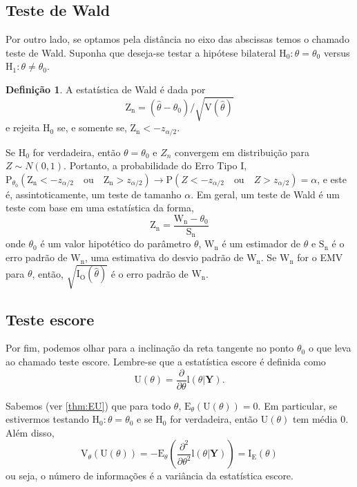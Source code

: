 \documentclass[
  9pt,
  a5paper,
]{book}
\theoremstyle{definition}
\newtheorem{definition}{Definição}[chapter]
\theoremstyle{definition}
\theoremstyle{definition}
\theoremstyle{definition}
\theoremstyle{remark}
\begin{document}
\hypertarget{teste-de-wald}{%
\subsection{Teste de Wald}\label{teste-de-wald}}

Por outro lado, se optamos pela distância no eixo das abscissas temos o chamado teste de Wald. Suponha que deseja-se testar a hipótese bilateral \(\mathrm{H_0} : \theta = \theta_0\) versus \(\mathrm{H_1} : \theta \neq \theta_0\).

\begin{definition}
\protect\hypertarget{def:unnamed-chunk-20}{}\label{def:unnamed-chunk-20}A estatística de Wald é dada por
\[\mathrm{Z_n} = (\hat{\theta} - \theta_0)/\sqrt{\mathrm{V}(\hat{\theta})}\]
e rejeita \(\mathrm{H_0}\) se, e somente se, \(\mathrm{Z_n} < -z_{\alpha/2}\).
\end{definition}

Se \(\mathrm{H_0}\) for verdadeira, então \(\theta = \theta_0\) e \(Z_n\) convergem em distribuição para \(Z \sim N(0,1)\). Portanto, a probabilidade do Erro Tipo I, \(\mathrm{P}_{\theta_0}(\mathrm{Z_n} < - z_{\alpha/2} \quad \text{ou} \quad \mathrm{Z_n} > z_{\alpha/2}) \to \mathrm{P}(Z < -z_{\alpha/2} \quad \text{ou} \quad Z > z_{\alpha/2}) = \alpha\), e este é, assintoticamente, um teste de tamanho \(\alpha\). Em geral, um teste de Wald é um teste com base em uma estatística da forma,
\[ \mathrm{Z_n} = \frac{\mathrm{W_n} -  \theta_0}{\mathrm{S_n} } \]
onde \(\theta_0\) é um valor hipotético do parâmetro \(\theta\), \(\mathrm{W_n}\) é um estimador de \(\theta\) e \(\mathrm{S_n}\) é o erro padrão de \(\mathrm{W_n}\), uma estimativa do desvio padrão de \(\mathrm{W_n}\). Se \(\mathrm{W_n}\) for o EMV para \(\theta\), então, \(\sqrt{\mathrm{I_O}(\hat{\theta})}\) é o erro padrão de \(\mathrm{W_n}\).

\hypertarget{teste-escore}{%
\subsection{Teste escore}\label{teste-escore}}

Por fim, podemos olhar para a inclinação da reta tangente no ponto \(\theta_0\) o que leva ao chamado teste escore. Lembre-se que a estatística escore é definida como
\[\mathrm{U}(\theta) = \frac{\partial}{\partial \theta} \mathrm{l}(\theta | \boldsymbol{Y}).\]

Sabemos (ver \ref{thm:EU}) que para todo \(\theta\), \(\mathrm{E}_{\theta} (\mathrm{U}(\theta)) = 0\).
Em particular, se estivermos testando \(\mathrm{H_0}: \theta = \theta_0\) e se \(\mathrm{H_0}\) for verdadeira, então \(\mathrm{U}(\theta)\) tem média \(0\). Além disso,
\[ \mathrm{V}_{\theta}(\mathrm{U}(\theta)) = -\mathrm{E}_{\theta} \left( \frac{\partial^2 }{\partial \theta^2} \mathrm{l}(\theta | \boldsymbol{Y}) \right) = \mathrm{I_E}(\theta)\]
ou seja, o número de informações é a variância da estatística escore.
\end{document}
